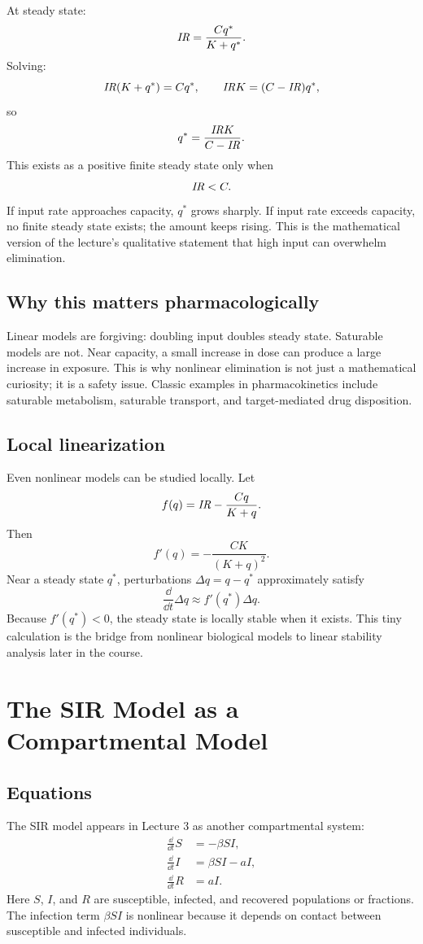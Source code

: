 \documentclass[a4paper]{article}
\newcommand{\ddt}{\frac{\dd}{\dd t}}
\newcommand{\IRate}{\ensuremath{\pksym{IR}}}
\begin{document}
At steady state:
\[
  \IRate=\frac{Cq^*}{K+q^*}.
\]
Solving:
\[
  \IRate(K+q^*)=Cq^*,
  \qquad
  \IRate K=(C-\IRate)q^*,
\]
so
\[
  q^*=\frac{\IRate K}{C-\IRate}.
\]
This exists as a positive finite steady state only when
\[
  \IRate<C.
\]
If input rate approaches capacity, \(q^*\) grows sharply. If input rate exceeds capacity, no finite steady state exists; the amount keeps rising. This is the mathematical version of the lecture's qualitative statement that high input can overwhelm elimination.

\subsection{Why this matters pharmacologically}

Linear models are forgiving: doubling input doubles steady state. Saturable models are not. Near capacity, a small increase in dose can produce a large increase in exposure. This is why nonlinear elimination is not just a mathematical curiosity; it is a safety issue. Classic examples in pharmacokinetics include saturable metabolism, saturable transport, and target-mediated drug disposition.

\subsection{Local linearization}

Even nonlinear models can be studied locally. Let
\[
  f(q)=\IRate-\frac{Cq}{K+q}.
\]
Then
\[
  f'(q)=-\frac{CK}{(K+q)^2}.
\]
Near a steady state \(q^*\), perturbations \(\Delta q=q-q^*\) approximately satisfy
\[
  \ddt \Delta q
  \approx
  f'(q^*)\Delta q.
\]
Because \(f'(q^*)<0\), the steady state is locally stable when it exists. This tiny calculation is the bridge from nonlinear biological models to linear stability analysis later in the course.

\section{The SIR Model as a Compartmental Model}

\subsection{Equations}

The SIR model appears in Lecture 3 as another compartmental system:
\[
  \begin{aligned}
  \ddt S&=-\beta SI,\\
  \ddt I&=\beta SI-aI,\\
  \ddt R&=aI.
  \end{aligned}
\]
Here \(S\), \(I\), and \(R\) are susceptible, infected, and recovered populations or fractions. The infection term \(\beta SI\) is nonlinear because it depends on contact between susceptible and infected individuals.
\end{document}
